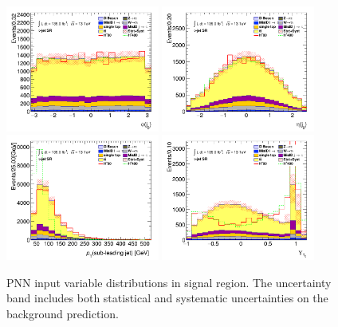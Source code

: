 		\begin{figure}[!htp]
			\begin{center}    
			\includegraphics[width=0.45\textwidth]{chapters/chapter6_HPlus/images/taujets/jet_0_phi_SR_TAUJET.png}
			\includegraphics[width=0.45\textwidth]{chapters/chapter6_HPlus/images/taujets/jet_0_eta_SR_TAUJET.png} \\
			\includegraphics[width=0.45\textwidth]{chapters/chapter6_HPlus/images/taujets/jet_1_pt_SR_TAUJET.png}
			\includegraphics[width=0.45\textwidth]{chapters/chapter6_HPlus/images/taujets/tau_0_upsilon_SR_TAUJET.png} \\
			\end{center}
			\caption{
			PNN input variable distributions in \taujets signal region. The uncertainty band includes both statistical and systematic uncertainties on the background prediction. 
			}
			\label{fig:sr-taujets-3}
		\end{figure}

